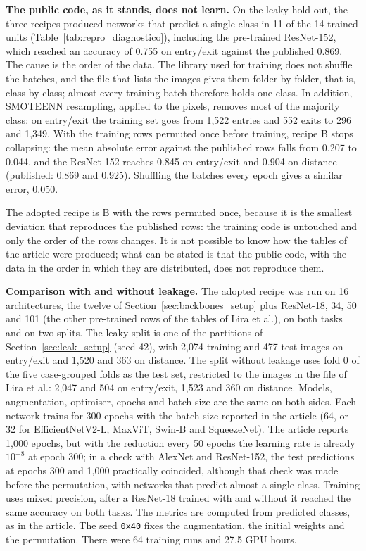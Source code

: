 \textbf{The public code, as it stands, does not learn.} On the leaky hold-out, the three recipes produced networks that predict a single class in 11 of the 14 trained units (Table~\ref{tab:repro_diagnostico}), including the pre-trained ResNet-152, which reached an accuracy of 0.755 on entry/exit against the published 0.869. The cause is the order of the data. The library used for training does not shuffle the batches, and the file that lists the images gives them folder by folder, that is, class by class; almost every training batch therefore holds one class. In addition, SMOTEENN resampling, applied to the pixels, removes most of the majority class: on entry/exit the training set goes from 1,522 entries and 552 exits to 296 and 1,349. With the training rows permuted once before training, recipe B stops collapsing: the mean absolute error against the published rows falls from 0.207 to 0.044, and the ResNet-152 reaches 0.845 on entry/exit and 0.904 on distance (published: 0.869 and 0.925). Shuffling the batches every epoch gives a similar error, 0.050.



The adopted recipe is B with the rows permuted once, because it is the smallest deviation that reproduces the published rows: the training code is untouched and only the order of the rows changes. It is not possible to know how the tables of the article were produced; what can be stated is that the public code, with the data in the order in which they are distributed, does not reproduce them.

\textbf{Comparison with and without leakage.} The adopted recipe was run on 16 architectures, the twelve of Section~\ref{sec:backbones_setup} plus ResNet-18, 34, 50 and 101 (the other pre-trained rows of the tables of Lira et al.), on both tasks and on two splits. The leaky split is one of the partitions of Section~\ref{sec:leak_setup} (seed 42), with 2,074 training and 477 test images on entry/exit and 1,520 and 363 on distance. The split without leakage uses fold 0 of the five case-grouped folds as the test set, restricted to the images in the file of Lira et al.: 2,047 and 504 on entry/exit, 1,523 and 360 on distance. Models, augmentation, optimiser, epochs and batch size are the same on both sides. Each network trains for 300 epochs with the batch size reported in the article (64, or 32 for EfficientNetV2-L, MaxViT, Swin-B and SqueezeNet). The article reports 1,000 epochs, but with the reduction every 50 epochs the learning rate is already $10^{-8}$ at epoch 300; in a check with AlexNet and ResNet-152, the test predictions at epochs 300 and 1,000 practically coincided, although that check was made before the permutation, with networks that predict almost a single class. Training uses mixed precision, after a ResNet-18 trained with and without it reached the same accuracy on both tasks. The metrics are computed from predicted classes, as in the article. The seed \texttt{0x40} fixes the augmentation, the initial weights and the permutation. There were 64 training runs and 27.5 GPU hours.

